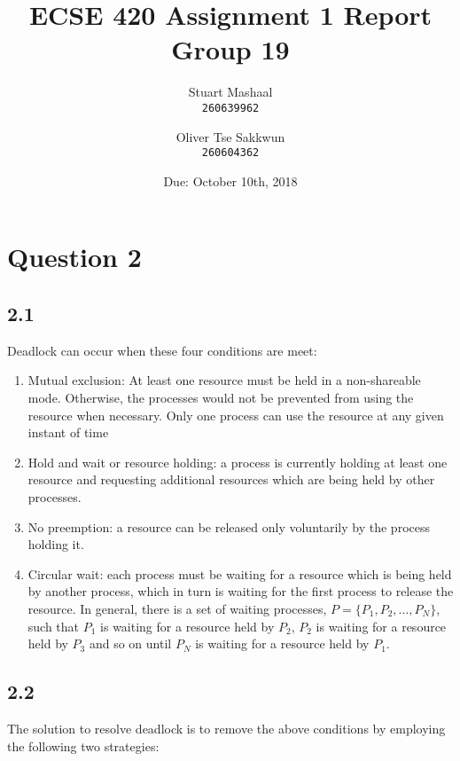 \documentclass[11pt, letterpaper]{article}
\title{ECSE 420 Assignment 1 Report\\Group 19}
\author{
    Stuart Mashaal\\
    \texttt{260639962}
    \and
    Oliver Tse Sakkwun\\
    \texttt{260604362}
}
\date{Due: October 10th, 2018}
\begin{document}
\begin{titlepage}
    \maketitle
    \thispagestyle{empty}
    \setcounter{page}{0}
\end{titlepage}

\section*{Question 2}

\subsection*{2.1}

Deadlock can occur when these four conditions are meet:

\begin{enumerate}
    \item Mutual exclusion: At least one resource must be held in a non-shareable mode. Otherwise, the processes would not be prevented from using the resource when necessary. Only one process can use the resource at any given instant of time
    \item Hold and wait or resource holding: a process is currently holding at least one resource and requesting additional resources which are being held by other processes.
    \item No preemption: a resource can be released only voluntarily by the process holding it.
    \item Circular wait: each process must be waiting for a resource which is being held by another process, which in turn is waiting for the first process to release the resource. In general, there is a set of waiting processes, $P = \{P_1, P_2, ..., P_N\}$, such that $P_1$ is waiting for a resource held by $P_2$, $P_2$ is waiting for a resource held by $P_3$ and so on until $P_N$ is waiting for a resource held by $P_1$.
\end{enumerate}

\subsection*{2.2}

The solution to resolve deadlock is to remove the above conditions by employing the following two strategies:
\end{document}
